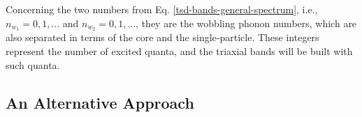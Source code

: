 Concerning the two numbers from Eq. \ref{tsd-bands-general-spectrum}, i.e., $n_{w_1}=0,1,\dots$ and $n_{w_2}=0,1,\dots$, they are the wobbling phonon numbers, which are also separated in terms of the core and the single-particle. These integers represent the number of excited quanta, and the triaxial bands will be built with such quanta. 

\subsection{An Alternative Approach}
\label{Omega-1-2-alternative-method}

